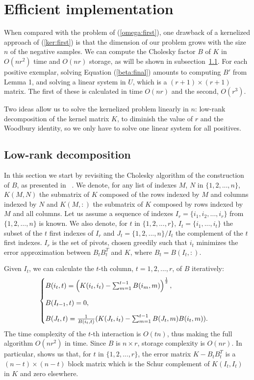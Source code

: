 
\section{Efficient implementation}\label{eff_imp}
When compared with the problem of (\ref{omega:first}), one drawback of a kernelized approach of (\ref{ker:first}) is that the dimension of our problem grows with the size $n$ of the negative samples.
We can compute the Cholesky factor $B$ of $K$ in $O(nr^2)$ time and $O(nr)$ storage, as will be shown in subsection~\ref{low-rank}. 
For each positive exemplar, solving Equation (\ref{beta:final}) amounts to computing $B'$ from Lemma 1, and solving a linear system in $U$, which is a $(r+1)\times (r+1)$ matrix. The first of these is calculated in time $O(nr)$ and the second, $O(r^3)$.

Two ideas allow us to solve the kernelized problem linearly in $n$: low-rank decomposition of the kernel matrix $K$, to diminish the value of $r$ and the Woodbury identity, so we only have to solve one linear system for all positives. 

\subsection{Low-rank decomposition} \label{low-rank}
In this section we start by revisiting the Cholesky algorithm of the construction of $B$, as presented in ~\cite{BaJo05,FiSc01}. 
We denote, for any list of indexes $M$, $N$ in $\{1,2,...,n\}$, $K(M,N)$ the submatrix of $K$ composed of the rows indexed by $M$ and columns indexed by $N$ and $K(M,:)$ the submatrix of $K$ composed by rows indexed by $M$ and all columns.
Let us assume a sequence of indexes $I_r=\{i_1,i_2,\dots ,i_r\}$ from $\{1,2,\dots, n\}$ is known. 
We also denote, for $t$ in $\{1,2,...,r\}$, $I_t=\{i_1,...,i_t\}$ the subset of the $t$ first indexes of $I_r$ and $J_t=\{1,2,...,n\}/ I_t$ the complement of the $t$ first indexes.
$I_r$ is the set of pivots, chosen greedily such that $i_t$ minimizes the error approximation between $B_tB_t^T$ and $K$, where $B_t=B(I_t,:)$. 

Given $I_t$, we can calculate the $t$-th column, $t=1,2,...,r$, of $B$ iteratively:
\begin{align}
\begin{cases}
\vspace{3 mm}
B(i_t, t) = \left(K(i_t,i_t)-\sum_{m=1}^{t-1} B(i_{m},m)  \right)^{\frac{1}{2}},\\
\vspace{3 mm}
B(I_{t-1},t) = 0,\\
B(J_t, t) = \frac{1}{B(i_t,t)}(K(J_t,i_t)  -\sum_{m=1}^{t-1}B(J_t,m)B(i_t,m)
).\end{cases}\label{icd:algo}
\end{align}
The time complexity of the $t$-th interaction is $O(tn)$, thus making the full algorithm $O(nr^2)$ in time. Since $B$ is $n\times r$, storage complexity is $O(nr)$. In particular, \cite{BaJo05} shows us that, for $t$ in $\{1,2,...,r\}$, the error matrix $K-B_tB_t^T$ is a $(n-t)\times (n-t)$ block matrix which is the Schur complement of $K(I_t,I_t)$ in $K$ and zero elsewhere.

